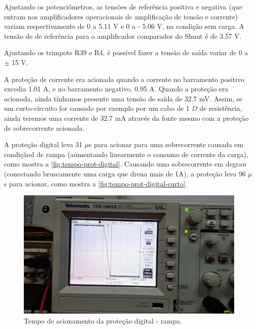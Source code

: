 \documentclass[
	12pt,				%
	oneside,			%
	a4paper,			%
	chapter=TITLE,
	sumario=tradicional,
	english,			%
	brazil				%
]{abntex2}
\begin{document}
Ajustando os potenciômetros, as tensões de referência positiva e negativa (que entram nos amplificadores operacionais de amplificação 
de tensão e corrente) variam respectivamente de 0 a 5.11 V e 0 a - 5.06 V, na condição 
sem carga. A tensão de de referência para o amplificador comparador do Shunt é de 3.57 V.

Ajustando os trimpots R39 e R4, é possível fazer a tensão de saída variar de 0 a $\pm$ 15 V.

A proteção de corrente era acionada quando a corrente no barramento positivo excedia 1.01 A, 
e no barramento negativo, 0.95 A. Quando a proteção era acionada, ainda tínhamos presente uma tensão 
de saída de 32.7 mV. Assim, se um curto-circuito for causado por exemplo por um cabo de 1 $\Omega$ 
de resistência, ainda teremos uma corrente de 32.7 mA através da fonte mesmo com a proteção de 
sobrecorrente acionada.

A proteção digital leva 31 $\mu$s para acionar para uma sobrecorrente 
causada em condiçãod de rampa (aumentando linearmente o consumo de corrente da carga),
como mostra a \autoref{fig:tempo-prot-digital}. Causando uma sobrecorrente
em degrau (conectando bruscamente uma carga que drena mais de 1A), a proteção 
leva 96 $\mu$s para acionar, como mostra a \autoref{fig:tempo-prot-digital-curto}.

\begin{figure}[H]
    \centering
    \includegraphics[width=0.9\linewidth]{images/resultados/tempo-prot-digital.jpeg}
    \caption{Tempo de acionamento da proteção digital - rampa.}
    \label{fig:tempo-prot-digital}
\end{figure}
\end{document}
